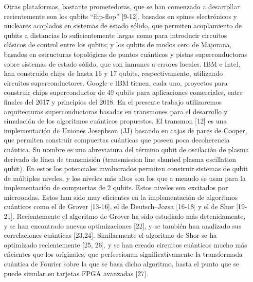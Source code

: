 Otras plataformas, bastante prometedoras, que se han comenzado a desarrollar recientemente son los qubits ``flip-flop'' [9-12], basados en spines electrónicos y nucleares acoplados en sistemas de estado sólido, que permiten acoplamiento de qubits a distancias lo suficientemente largas como para introducir circuitos clásicos de control entre los qubits; y los qubits de modos cero de Majorana, basados en estructuras topológicas de puntos cuánticos y pistas superconductoras sobre sistemas de estado sólido, que son inmunes a errores locales. IBM e Intel, han construido chips de hasta 16 y 17 qubits, respectivamente, utilizando circuitos superconductores. Google e IBM tienen, cada uno, proyectos para construir chips superconductor de 49 qubits para aplicaciones comerciales, entre finales del 2017 y principios del 2018.  En el presente trabajo utilizaremos arquitecturas superconductoras basadas en transmones para el desarrollo y simulación de los algoritmos cuánticos propuestos. El transmon [12] es una implementación de Uniones Josephson (JJ) basando en cajas de pares de Cooper, que permiten construir compuertas cuánticas que poseen poca decoherencia cuántica. Su nombre es una abreviatura del término qubit de oscilación de plasma derivado de línea de transmisión (transmission line shunted plasma oscillation qubit). En estos los potenciales involucrados permiten construir sistemas de qubit de múltiples niveles, y los niveles más altos son los que a menudo se usan para la implementación de compuertas de 2 qubits. Estos niveles son excitados por microondas. Estos han sido muy eficientes en la implementación de algoritmos cuánticos como el de Grover [13-16], el de Deutsch–Jozsa [16-18] y el de Shor [19-21].  Recientemente el algoritmo de Grover ha sido estudiado más detenidamente, y se han encontrado nuevas optimizaciones [22], y se también han analizado sus correlaciones cuánticas [23,24]. Similarmente el algoritmo de Shor se ha optimizado recientemente [25, 26], y se han creado circuitos cuánticos mucho más eficientes que los originales, que perfeccionan significativamente la transformada cuántica de Fourier sobre la que se basa dicho algoritmo, hasta el punto que se puede simular en tarjetas FPGA avanzadas [27].

